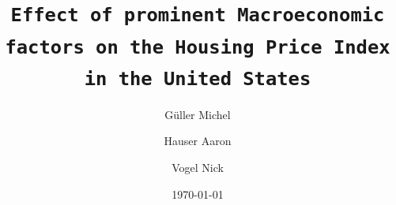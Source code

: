 \documentclass[12pt]{beamer}
\title[]{\texttt{Effect of prominent Macroeconomic factors on the Housing Price Index in the United States}}
\author[]{
    Güller Michel \and
    Hauser Aaron \and
    Vogel Nick}
\date{\today}
\begin{document}
\maketitle
\small



\end{document}
